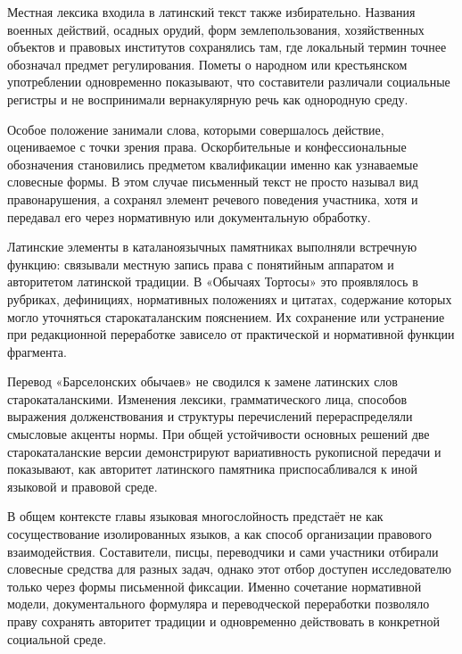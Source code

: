 Местная лексика входила в латинский текст также избирательно. Названия военных действий, осадных орудий, форм землепользования, хозяйственных объектов и правовых институтов сохранялись там, где локальный термин точнее обозначал предмет регулирования. Пометы о народном или крестьянском употреблении одновременно показывают, что составители различали социальные регистры и не воспринимали вернакулярную речь как однородную среду.

Особое положение занимали слова, которыми совершалось действие, оцениваемое с точки зрения права. Оскорбительные и конфессиональные обозначения становились предметом квалификации именно как узнаваемые словесные формы. В этом случае письменный текст не просто называл вид правонарушения, а сохранял элемент речевого поведения участника, хотя и передавал его через нормативную или документальную обработку.

Латинские элементы в каталаноязычных памятниках выполняли встречную функцию: связывали местную запись права с понятийным аппаратом и авторитетом латинской традиции. В «Обычаях Тортосы» это проявлялось в рубриках, дефинициях, нормативных положениях и цитатах, содержание которых могло уточняться старокаталанским пояснением. Их сохранение или устранение при редакционной переработке зависело от практической и нормативной функции фрагмента.

Перевод «Барселонских обычаев» не сводился к замене латинских слов старокаталанскими. Изменения лексики, грамматического лица, способов выражения долженствования и структуры перечислений перераспределяли смысловые акценты нормы. При общей устойчивости основных решений две старокаталанские версии демонстрируют вариативность рукописной передачи и показывают, как авторитет латинского памятника приспосабливался к иной языковой и правовой среде.

В общем контексте главы языковая многослойность предстаёт не как сосуществование изолированных языков, а как способ организации правового взаимодействия. Составители, писцы, переводчики и сами участники отбирали словесные средства для разных задач, однако этот отбор доступен исследователю только через формы письменной фиксации. Именно сочетание нормативной модели, документального формуляра и переводческой переработки позволяло праву сохранять авторитет традиции и одновременно действовать в конкретной социальной среде.
